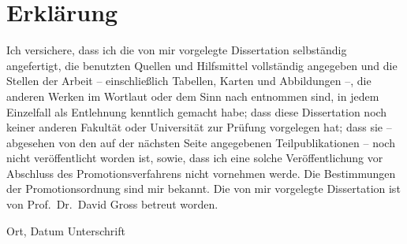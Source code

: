 \documentclass[
  a4paper,
  11pt,
  BCOR=8mm,
  twoside,
  headsepline]{scrbook}
\begin{document}
\clearpage
\chapter*{Erklärung}

Ich versichere, dass ich die von mir vorgelegte Dissertation selbständig angefertigt, die benutzten Quellen und Hilfsmittel vollständig angegeben und die Stellen der Arbeit -- einschließlich Tabellen, Karten und Abbildungen --, die anderen Werken im Wortlaut oder dem Sinn nach entnommen sind, in jedem Einzelfall als Entlehnung kenntlich gemacht habe; dass diese Dissertation noch keiner anderen Fakultät oder Universität zur Prüfung vorgelegen hat; dass sie -- abgesehen von den auf der nächsten Seite angegebenen Teilpublikationen -- noch nicht veröffentlicht worden ist, sowie, dass ich eine solche Veröffentlichung vor Abschluss des Promotionsverfahrens nicht vornehmen werde.
Die Bestimmungen der Promotionsordnung sind mir bekannt.
Die von mir vorgelegte Dissertation ist von Prof.\ Dr.\ David Gross betreut worden.

\vspace{4cm}

Ort, Datum \hfill Unterschrift \hspace{2cm}
\end{document}
